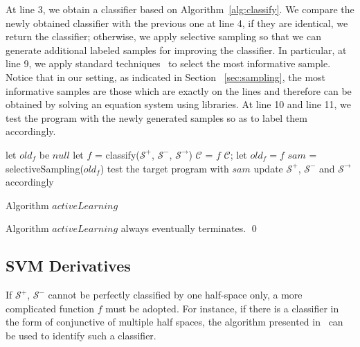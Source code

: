 At line 3, we obtain a classifier based on Algorithm~\ref{alg:classify}. 
We compare the newly obtained classifier with the previous one at line 4, if they are identical, we return the classifier; 
otherwise, we apply selective sampling so that we can generate additional labeled samples for improving the classifier. 
In particular, at line 9, we apply standard techniques~\cite{DBLP:conf/icml/SchohnC00} to select the most informative sample. 
Notice that in our setting, as indicated in Section ~\ref{sec:sampling}, the most informative samples are those which are exactly on the lines 
and therefore can be obtained by solving an equation system using libraries. 
At line 10 and line 11, we test the program with the newly generated samples so as to label them accordingly.
\begin{algorithm}[t]
\SetAlgoVlined
\Indm
{}
\Indp
let $old_f$ be $null$\;
 {
    let $f$ = classify($\mathcal{S}^+$, $\mathcal{S}^-$, $\mathcal{S}^\rightarrow$)\;
     {
         {
            $\mathcal{C}$ = $f$\;
            \Return $\mathcal{C}$;
        }
        let $old_f = f$\;
    }
    $sam$ = selectiveSampling($old_f$)\;
    test the target program with $sam$\;
    update $\mathcal{S}^+$, $\mathcal{S}^-$ and $\mathcal{S}^\rightarrow$ accordingly\;
}
\caption{Algorithm $activeLearning$}
\label{alg:active}
\end{algorithm}



\begin{proposition}
Algorithm $activeLearning$ always eventually terminates. \hfill \qed
\end{proposition}


\subsection{SVM Derivatives}
If $\mathcal{S}^+$, $\mathcal{S}^-$ cannot be perfectly classified by one half-space only, 
a more complicated function $f$ must be adopted. 
For instance, if there is a classifier in the form of conjunctive of multiple half spaces, 
the algorithm presented in~\cite{Sharma2012} can be used to identify such a classifier.

